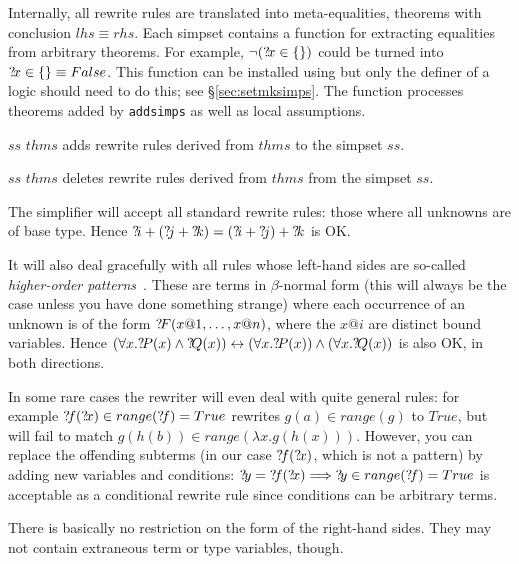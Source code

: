 Internally, all rewrite rules are translated into meta-equalities,
theorems with conclusion $lhs \equiv rhs$.  Each simpset contains a
function for extracting equalities from arbitrary theorems.  For
example, $\neg({?\!x}\in \{\})$ could be turned into ${?\!x}\in \{\}
\equiv False$.  This function can be installed using
 but only the definer of a logic should need to do
this; see {\S}\ref{sec:setmksimps}.  The function processes theorems
added by \texttt{addsimps} as well as local assumptions.

\begin{ttdescription}
  
\item[$ss$ \ttindexbold{addsimps} $thms$] adds rewrite rules derived
  from $thms$ to the simpset $ss$.
  
\item[$ss$ \ttindexbold{delsimps} $thms$] deletes rewrite rules
  derived from $thms$ from the simpset $ss$.

\end{ttdescription}

\begin{warn}
  The simplifier will accept all standard rewrite rules: those where
  all unknowns are of base type.  Hence ${{?\!i}+({?\!j}+{?\!k})} =
  {({?\!i}+{?\!j})+{?\!k}}$ is OK.
  
  It will also deal gracefully with all rules whose left-hand sides
  are so-called {\em higher-order patterns}~\cite{nipkow-patterns}.
  These are terms in $\beta$-normal form (this will always be the case
  unless you have done something strange) where each occurrence of an
  unknown is of the form ${?\!F}(x@1,\dots,x@n)$, where the $x@i$ are
  distinct bound variables. Hence $(\forall x.{?\!P}(x) \land
  {?\!Q}(x)) \leftrightarrow (\forall x.{?\!P}(x)) \land (\forall
  x.{?\!Q}(x))$ is also OK, in both directions.
  
  In some rare cases the rewriter will even deal with quite general
  rules: for example ${{?\!f}({?\!x})\in range({?\!f})} = True$
  rewrites $g(a) \in range(g)$ to $True$, but will fail to match
  $g(h(b)) \in range(\lambda x.g(h(x)))$.  However, you can replace
  the offending subterms (in our case ${?\!f}({?\!x})$, which is not
  a pattern) by adding new variables and conditions: ${?\!y} =
  {?\!f}({?\!x}) \Longrightarrow {?\!y}\in range({?\!f}) = True$ is
  acceptable as a conditional rewrite rule since conditions can be
  arbitrary terms.
  
  There is basically no restriction on the form of the right-hand
  sides.  They may not contain extraneous term or type variables,
  though.
\end{warn}


